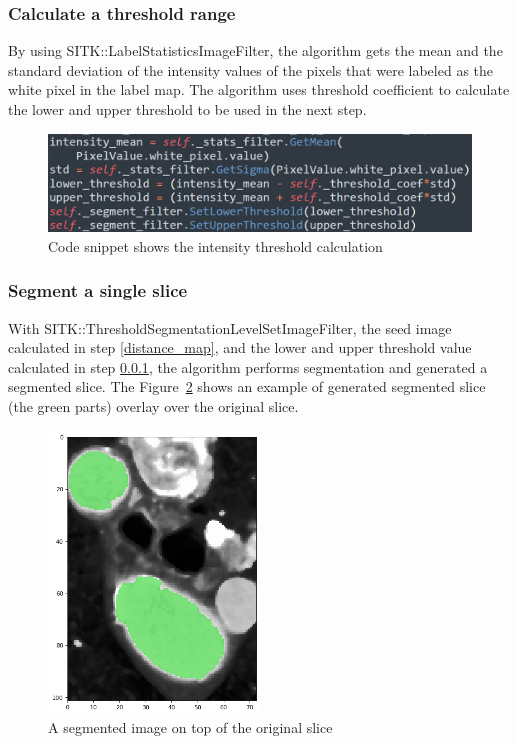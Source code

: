 \subsubsection{Calculate a threshold range} \label{threshold}
By using SITK::LabelStatisticsImageFilter, the algorithm gets the mean and the standard deviation of the intensity values of the pixels that were labeled as the white pixel in the label map. The algorithm uses threshold coefficient to calculate the lower and upper threshold to be used in the next step.

\begin{figure}[H]
    \centering
    \includegraphics[width=\textwidth]{figures/AGR/threshold.png}
    \caption[Code that shows how to calculate the threshold range]{Code snippet shows the intensity threshold calculation}
    \label{fig_threshold}
\end{figure}

\subsubsection{Segment a single slice}
With SITK::ThresholdSegmentationLevelSetImageFilter, the seed image calculated in step \ref{distance_map}, and the lower and upper threshold value calculated in step \ref{threshold}, the algorithm performs segmentation and generated a segmented slice. The Figure~\ref{fig_segmented_image} shows an example of generated segmented slice (the green parts) overlay over the original slice.

\begin{figure}[H]
    \centering
    \includegraphics[width=0.5\textwidth]{figures/AGR/segment_label_image.png}
    \caption[A segmented image]{A segmented image on top of the original slice}
    \label{fig_segmented_image}
\end{figure}

